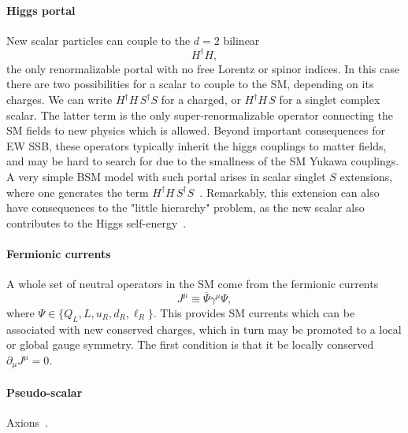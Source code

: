 \paragraph{Higgs portal} New scalar particles can couple to the $d=2$ bilinear 
%
\begin{equation}
 H^\dagger H,
\end{equation}
%
the only renormalizable portal with no free Lorentz or spinor indices. In this case there are two possibilities for a scalar to couple to the SM, depending on its charges. We can write  $H^\dagger H \, S^\dagger S$ for a charged, or $H^\dagger H\, S $ for a singlet complex scalar. The latter term is the only super-renormalizable operator connecting the SM fields to new physics which is allowed. Beyond important consequences for EW SSB, these operators typically inherit the higgs couplings to matter fields, and may be hard to search for due to the smallness of the SM Yukawa couplings. A very simple BSM model with such portal arises in scalar singlet $S$ extensions, where one generates the term $H^\dagger H \, S^\dagger S$~\cite{Silveira:1985rk}. Remarkably, this extension can also have consequences to the "little hierarchy" problem, as the new scalar also contributes to the Higgs self-energy~\cite{Craig:2013xia}.


\paragraph{Fermionic currents}

A whole set of neutral operators in the SM come from the fermionic currents
\begin{equation}
 J^\mu \equiv \overline{\Psi} \gamma^\mu \Psi,
\end{equation}
where $\Psi \in \{Q_L, L, u_R, d_R, \ell_R\}$. This provides SM currents which can be associated with new conserved charges, which in turn may be promoted to a local or global gauge symmetry. The first condition is that it be locally conserved $\partial_\mu J^\mu = 0$. 

\paragraph{Pseudo-scalar} Axions~\cite{Weinberg:1977ma}.




